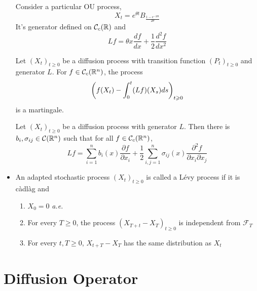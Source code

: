 \documentclass[a4paper,12pt]{article}
\begin{document}
\begin{itemize}
  \begin{exam}
    Consider a particular OU process,
    \begin{equation*}
      X_t = e^{\theta t}B_{\frac{1-e^{-2\theta t}}{2\theta}}
    \end{equation*}
    It's generator defined on $\mathcal{C}_c(\mathbb{R})$ and
    \begin{equation*}
      Lf = \theta x \frac{df}{dx} + \frac{1}{2}\frac{d^2f}{dx^2}
    \end{equation*}
  \end{exam}

  \begin{prop}
    Let $(X_t)_{t \geqslant 0}$ be a diffusion process with transition function $(P_t)_{t \geqslant 0}$ and generator $L$. For $f \in \mathcal{C}_c(\mathbb{R}^n)$, the process
    \begin{equation*}
      \left(f(X_t)-\int_0^t(Lf)(X_s)ds\right)_{t \geqslant 0}
    \end{equation*}
    is a martingale.
  \end{prop}

  \begin{thm}
    Let $(X_t)_{t \geqslant 0}$ be a diffusion process with generator $L$. Then there is $b_i,\sigma_{ij} \in \mathcal{C}(\mathbb{R}^n)$ such that for all $f \in \mathcal{C}_c(\mathbb{R}^n)$,
    \begin{equation*}
      Lf = \sum_{i=1}^nb_i(x)\frac{\partial f}{\partial x_i} + \frac{1}{2}\sum_{i,j=1}^n \sigma_{ij}(x)\frac{\partial^2f}{\partial x_i \partial x_j}
    \end{equation*}
  \end{thm}

  \item An adapted stochastic process $(X_t)_{t \geqslant 0}$ is called a L\'evy process if it is c\`adl\`ag and
  \begin{enumerate}[label=(\arabic*)]
    \item $X_0 = 0$ \emph{a.e.}
    \item For every $T \geqslant 0$, the process $(X_{T+t} - X_T)_{t \geqslant 0}$ is independent from $\mathcal{F}_T$
    \item For every $t, T \geqslant 0$, $X_{t+T} - X_T$ has the same distribution as $X_t$
  \end{enumerate}
\end{itemize}

\section{Diffusion Operator}
\end{document}
